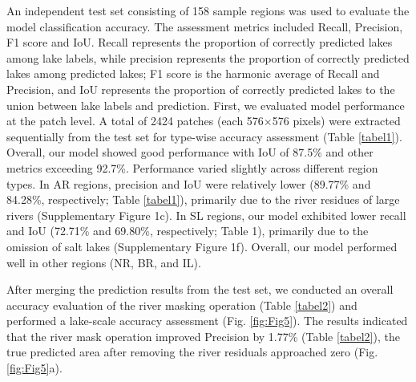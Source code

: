 \documentclass[preprint,12pt,authoryear]{elsarticle}
\begin{document}
An independent test set consisting of 158 sample regions was used to evaluate the model classification accuracy. The assessment metrics included Recall, Precision, F1 score and IoU. Recall represents the proportion of correctly predicted lakes among lake labels, while precision represents the proportion of correctly predicted lakes among predicted lakes; F1 score is the harmonic average of Recall and Precision, and IoU represents the proportion of correctly predicted lakes to the union between lake labels and prediction. First, we evaluated model performance at the patch level. A total of 2424 patches (each 576×576 pixels) were extracted sequentially from the test set for type-wise accuracy assessment (Table \ref{tabel1}). Overall, our model showed good performance with IoU of 87.5\% and other metrics exceeding 92.7\%. Performance varied slightly across different region types. In AR regions, precision and IoU were relatively lower (89.77\% and 84.28\%, respectively; Table \ref{tabel1}), primarily due to the river residues of large rivers (Supplementary Figure 1c). In SL regions, our model exhibited lower recall and IoU (72.71\% and 69.80\%, respectively; Table 1), primarily due to the omission of salt lakes (Supplementary Figure 1f). Overall, our model performed well in other regions (NR, BR, and IL). 

After merging the prediction results from the test set, we conducted an overall accuracy evaluation of the river masking operation (Table \ref{tabel2}) and performed a lake-scale accuracy assessment (Fig. \ref{fig:Fig5}). The results indicated that the river mask operation improved Precision by 1.77\% (Table \ref{tabel2}), the true predicted area after removing the river residuals approached zero (Fig. \ref{fig:Fig5}a). 
\end{document}
